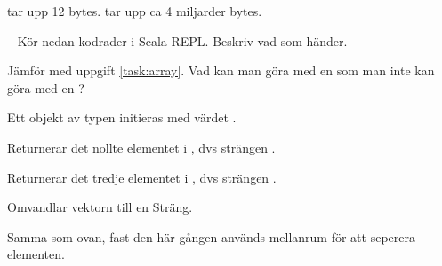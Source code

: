 \SubtaskSolved  {} tar upp 12 bytes.  tar upp ca 4 miljarder bytes.



\QUESTEND









\QUESTBEGIN

\Task  \what~  Kör nedan kodrader i Scala REPL. Beskriv vad som händer.

\Subtask {}

\Subtask {}

\Subtask {}

\Subtask {}

\Subtask {}

\Subtask {}

\Subtask {}

\Subtask {}

\Subtask {}

\Subtask {}

\Subtask {}

\Subtask {}

\Subtask {}

\Subtask {}

\Subtask\Pen Jämför med uppgift \ref{task:array}. Vad kan man göra med en  som man inte kan göra med en ?

\SOLUTION


\TaskSolved \what


\SubtaskSolved  Ett objekt av typen  initieras med värdet .

\SubtaskSolved  Returnerar det nollte elementet i , dvs strängen .

\SubtaskSolved  Returnerar det tredje elementet i , dvs strängen \code{!}.

\SubtaskSolved  Omvandlar vektorn till en Sträng.

\SubtaskSolved  Samma som ovan, fast den här gången används mellanrum för att seperera elementen.

